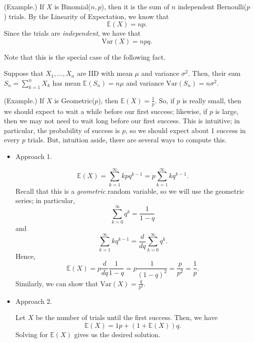 \begin{mdframed}[]
    (Example.) If $X$ is Binomial($n, p$), then it is the sum of $n$ independent Bernoulli($p$) trials. By the Linearity of Expectation, we know that 
    \[\mathbb{E}(X) = np.\]
    Since the trials are \emph{independent}, we have that 
    \[\text{Var}(X) = npq.\]
\end{mdframed}
Note that this is the special case of the following fact. 
\begin{theorem}{}{}
    Suppose that $X_1, \dots, X_n$ are IID with mean $\mu$ and variance $\sigma^2$. Then, their sum $S_n = \sum_{k = 1}^{n} X_k$ has mean $\mathbb{E}(S_n) = n\mu$ and variance $\text{Var}(S_n) = n\sigma^2$. 
\end{theorem}

\begin{mdframed}[]
    (Example.) If $X$ is Geometric($p$), then $\mathbb{E}(X) = \frac{1}{p}$. So, if $p$ is really small, then we should expect to wait a while before our first success; likewise, if $p$ is large, then we may not need to wait long before our first success. This is intuitive; in particular, the probability of success is $p$, so we should expect about 1 success in every $p$ trials. But, intuition aside, there are several ways to compute this.
    \begin{itemize}
        \item Approach 1.
        \begin{mdframed}[]
            \[\mathbb{E}(X) = \sum_{k = 1}^{\infty} kpq^{k - 1} = p\sum_{k = 1}^{\infty} kq^{k - 1}.\]
            Recall that this is a \emph{geometric} random variable, so we will use the geometric series; in particular, 
            \[\sum_{k = 0}^{\infty} q^k = \frac{1}{1 - q}\]
            and 
            \[\sum_{k = 1}^{\infty} kq^{k - 1} = \frac{d}{dq} \sum_{k = 0}^{\infty} q^k.\]
            Hence,
            \[\mathbb{E}(X) = p \frac{d}{dq} \frac{1}{1 - q} = p\frac{1}{(1 - q)^2} = \frac{p}{p^2} = \frac{1}{p}.\] 
            Similarly, we can show that $\text{Var}(X) = \frac{q}{p^2}$. 
        \end{mdframed}

        \item Approach 2. 
        \begin{mdframed}[]
            Let $X$ be the number of trials until the first success. Then, we have 
            \[\mathbb{E}(X) = 1p + (1 + \mathbb{E}(X))q.\]
            Solving for $\mathbb{E}(X)$ gives us the desired solution.
        \end{mdframed}
    \end{itemize}
\end{mdframed}

